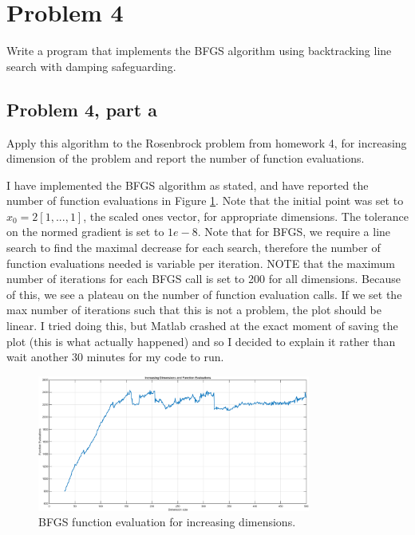 \section{Problem 4}
Write a program that implements the BFGS algorithm using backtracking line search with damping safeguarding.

\subsection{Problem 4, part a}
Apply this algorithm to the Rosenbrock problem from homework 4, for increasing dimension of the problem and report the number of function evaluations.
\partbreak
\begin{solution}

    I have implemented the BFGS algorithm as stated, and have reported the number of function evaluations in Figure \ref{fig:inc-dim}. Note that the initial point was set to $x_0 = 2[1, ..., 1]$, the scaled ones vector, for appropriate dimensions. The tolerance on the normed gradient is set to $1e-8$. Note that for BFGS, we require a line search to find the maximal decrease for each search, therefore the number of function evaluations needed is variable per iteration. NOTE that the maximum number of iterations for each BFGS call is set to 200 for all dimensions. Because of this, we see a plateau on the number of function evaluation calls. If we set the max number of iterations such that this is not a problem, the plot should be linear. I tried doing this, but Matlab crashed at the exact moment of saving the plot (this is what actually happened) and so I decided to explain it rather than wait another 30 minutes for my code to run. 
\end{solution}

\vspace{15mm}
\begin{figure}[!h]
    \centering
    \includegraphics[width=0.8\textwidth]{Plots/inc_dim.png}
    \caption{BFGS function evaluation for increasing dimensions.}
    \label{fig:inc-dim}
\end{figure}

